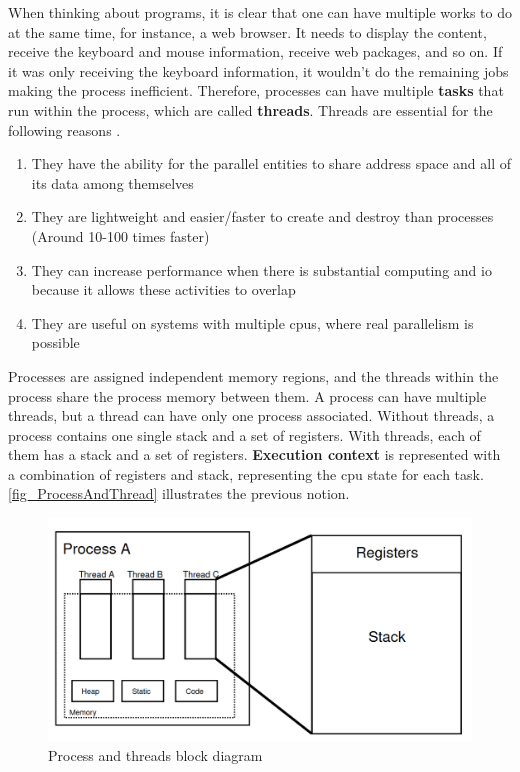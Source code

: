 When thinking about programs, it is clear that one can have multiple works to do at the same time, for instance, a web browser. It needs to 
display the content, receive the keyboard and mouse information, receive web packages, and so on. If it was only receiving the keyboard 
information, it wouldn't do the remaining jobs making the process inefficient. Therefore, processes can have multiple \textbf{tasks} that run 
within the process, which are called \textbf{threads}. Threads are essential for the following reasons \cite{OSbook}.

\begin{enumerate}
    \item They have the ability for the parallel entities to share address space and all of its data among themselves

    \item They are lightweight and easier/faster to create and destroy than processes (Around 10-100 times faster)

    \item They can increase performance when there is substantial computing and \gls{io} because it allows these activities to overlap

    \item They are useful on systems with multiple \glspl{cpu}, where real parallelism is possible
\end{enumerate}

Processes are assigned independent memory regions, and the threads within the process share the process memory between them. A process can 
have multiple threads, but a thread can have only one process associated. Without threads, a process contains one single stack and a set of 
registers. With threads, each of them has a stack and a set of registers. \textbf{Execution context} is represented with a combination of 
registers and stack, representing the \gls{cpu} state for each task. \autoref{fig_ProcessAndThread} illustrates the previous notion. 

\begin{figure}[H]
	\centering
 	\includegraphics[width=0.7\linewidth]{Images/ProcessAndThread.png}
 	\caption{ Process and threads block diagram }
	 \label{fig_ProcessAndThread}
\end{figure}

